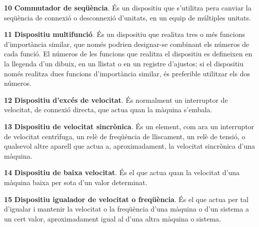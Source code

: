 \begin{multicols}{2}
\begin{list}{}
\item[\textbf{10}]   
\textbf{Commutador de seq\"{u}\`{e}ncia}. \'{E}s un
dispositiu que s'utilitza pera canviar la seq\"{u}\`{e}ncia de connexi\'{o} o
desconnexi\'{o} d'unitats, en un equip de m\'{u}ltiples unitats.


\item[\textbf{11}]  
\textbf{Dispositiu multifunci\'{o}}. \'{E}s un dispositiu que realitza tres o m\'{e}s funcions d'import\`{a}ncia similar, que nom\'{e}s podrien designar-se combinant els n\'{u}meros de cada funci\'{o}. El n\'{u}meros de les funcions que realitza el dispositiu es defineixen en la llegenda d'un dibuix, en un llistat o en un registre d'ajustos; si el dispositiu nom\'{e}s realitza dues funcions d'import\`{a}ncia similar, \'{e}s preferible utilitzar els dos n\'{u}meros.

\item[\textbf{12}]   
\textbf{Dispositiu d'exc\'{e}s de velocitat}. \'{E}s normalment un
interruptor de velocitat, de connexi\'{o} directa, que
actua quan la m\`{a}quina  s'embala.

\item[\textbf{13}]   
\textbf{Dispositiu de velocitat sincr\`{o}nica}. \'{E}s un element, com ara un interruptor de
velocitat centr\'{\i}fuga, un rel\`{e} de freq\"{u}\`{e}ncia de lliscament, un rel\`{e}
de tensi\'{o}, o qualsevol altre aparell que actua a, aproximadament, la
velocitat sincr\`{o}nica d'una m\`{a}quina.


\item[\textbf{14}]   
\textbf{Dispositiu de baixa velocitat}. \'{E}s el que actua quan la velocitat d'una m\`{a}quina baixa per sota d'un valor determinat.

\item[\textbf{15}]  
\textbf{Dispositiu igualador de velocitat o freq\"{u}\`{e}ncia}. \'{E}s el que
actua per tal d'igualar i mantenir la velocitat o la  freq\"{u}\`{e}ncia
d'una m\`{a}quina o d'un sistema a un cert valor, aproximadament igual
al  d'una altra m\`{a}quina o sistema.


\end{list}
\end{multicols}
